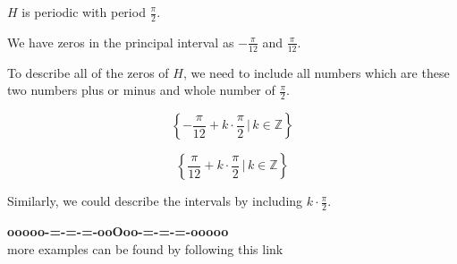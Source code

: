 \documentclass{ximera}
\begin{document}
$H$ is periodic with period $\frac{\pi}{2}$. 



We have zeros in the principal interval as $-\frac{\pi}{12}$ and $\frac{\pi}{12}$. 


To describe all of the zeros of $H$, we need to include all numbers which are these two numbers plus or minus and whole number of $\frac{\pi}{2}$. 



\[
\left\{  -\frac{\pi}{12} + k  \cdot \frac{\pi}{2}  \, | \,  k \in \mathbb{Z}         \right\}
\]



\[
\left\{  \frac{\pi}{12} + k  \cdot \frac{\pi}{2}  \, | \,  k \in \mathbb{Z}         \right\}
\]




Similarly, we could describe the intervals by including $k  \cdot \frac{\pi}{2} $. 













\begin{onlineOnly}
\begin{center}
\textbf{\textcolor{green!50!black}{ooooo-=-=-=-ooOoo-=-=-=-ooooo}} \\

more examples can be found by following this link\\ 

\end{center}
\end{onlineOnly}
\end{document}
